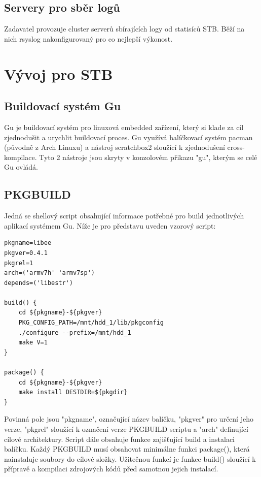 \documentclass[thesis=B,czech]{FITthesis}[2012/06/26]
\begin{document}
\subsection{Servery pro sběr logů}
Zadavatel provozuje cluster serverů sbírajících logy od statisíců STB. Běží na nich rsyslog nakonfigurovaný pro co nejlepší výkonost.


\section{Vývoj pro STB}
\subsection{Buildovací systém Gu}
Gu je buildovací systém pro linuxová embedded zařízení, který si klade za cíl zjednodušit a urychlit buildovací proces. Gu využívá balíčkovací systém pacman (původně z Arch Linuxu) a nástroj scratchbox2 sloužící k zjednodušení cross-kompilace. Tyto 2 nástroje jsou skryty v konzolovém přikazu "gu", kterým se celé Gu ovládá.

\subsection{PKGBUILD}
Jedná se shellový script obsahující informace potřebné pro build jednotlivých aplikací systémem Gu. Níže je pro představu uveden vzorový script:
\begin{scriptsize}
\begin{verbatim}
pkgname=libee
pkgver=0.4.1
pkgrel=1
arch=('armv7h' 'armv7sp')
depends=('libestr')

build() {
    cd ${pkgname}-${pkgver}
    PKG_CONFIG_PATH=/mnt/hdd_1/lib/pkgconfig
    ./configure --prefix=/mnt/hdd_1
    make V=1
}

package() {
    cd ${pkgname}-${pkgver}
    make install DESTDIR=${pkgdir}
}
\end{verbatim}
\end{scriptsize}

Povinná pole jsou "pkgname", označující název balíčku, "pkgver" pro určení jeho verze, "pkgrel" sloužící k označení verze PKGBUILD scriptu a "arch" definující cílové architektury.
 Script dále obsahuje funkce zajišťující build a instalaci balíčku. Každý PKGBUILD musí obsahovat minimálne funkci package(), která nainstaluje soubory do cílové složky. Užitečnou funkcí je funkce build() sloužící k přípravě a kompilaci zdrojových kódů před samotnou jejich instalací.
\end{document}
